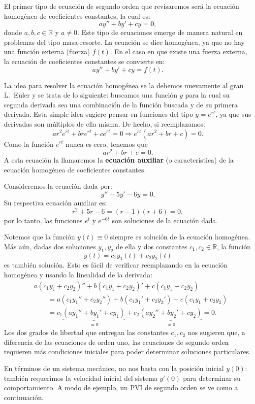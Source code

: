 El primer tipo de ecuaci\'on de segundo orden que revisaremos ser\'a la ecuaci\'on homog\'enea de coeficientes constantes, la cual es:
\[
ay''+by'+cy=0,
\]
donde $a,b,c\in\mathbb{R}$ y $a\neq 0$. Este tipo de ecuaciones emerge de manera natural en problemas del tipo masa-resorte. La ecuaci\'on se dice homog\'enea, ya que no hay una funci\'on externa (fuerza) $f(t)$. En el caso en que existe una fuerza externa, la ecuaci\'on de coeficientes constantes se convierte en:
\[
ay''+by'+cy=f(t).
\]

La idea para resolver la ecuaci\'on homog\'enea se la debemos nuevamente al gran L.~Euler y se trata de lo siguiente: buscamos una funci\'on $y$ para la cual su segunda derivada sea una combinaci\'on de la funci\'on buscada y de su primera derivada. Esta simple idea sugiere pensar en funciones del tipo $y=e^{rt}$, ya que sus derivadas son m\'ultiplos de ella misma. De hecho, si reemplazamos:
\[
ar^2e^{rt}+bre^{rt}+ce^{rt}=0\Longrightarrow e^{rt}(ar^2+br+c)=0.
\]
Como la funci\'on $e^{rt}$ nunca es cero, tenemos que
\[
ar^2+br+c=0.
\]
A esta ecuaci\'on la llamaremos la \textbf{ecuaci\'on auxiliar} (o caracter\'istica) de la ecuaci\'on homog\'enea de coeficientes constantes.

\begin{example}
  Consideremos la ecuaci\'on dada por:
  \[
  y''+5y'-6y=0.
  \]
  Su respectiva ecuaci\'on auxiliar es:
  \[
  r^2+5r-6=(r-1)(r+6)=0,
  \]
  por lo tanto, las funciones $e^{t}$ y $e^{-6t}$ son soluciones de la ecuaci\'on dada.
\end{example}
\newpage
\begin{remark}
    Notemos que la funci\'on $y(t)\equiv 0$ siempre es soluci\'on de la ecuaci\'on homog\'enea. M\'as a\'un, dadas dos soluciones $y_1,y_2$ de ella y dos constantes $c_1,c_2\in \mathbb{R}$, la funci\'on
    \[
    y(t)=c_1y_1(t)+c_2y_2(t)
    \]
    es tambi\'en soluci\'on. Esto es f\'acil de verificar reemplazando en la ecuaci\'on homog\'enea y usando la linealidad de la derivada:
    \begin{align*}
      &a(c_1y_1+c_2y_2)''+b(c_1y_1+c_2y_2)'+c(c_1y_1+c_2y_2)\\
      &\qquad= a(c_1y_1''+c_2y_2'')+b(c_1y_1'+c_2y_2')+c(c_1y_1+c_2y_2)\\
      &\qquad= c_1\underbrace{(ay_1''+by_1'+cy_1)}_{=0}+c_2\underbrace{(ay_2''+by_2'+cy_2)}_{=0}=0.
    \end{align*}
    Los dos grados de libertad que entregan las constantes $c_1,c_2$ nos sugieren que, a diferencia de las ecuaciones de orden uno, las ecuaciones de segundo orden requieren m\'as condiciones iniciales para poder determinar soluciones particulares.

    En t\'erminos de un sistema mec\'anico, no nos basta con la posici\'on inicial $y(0)$: tambi\'en requerimos la velocidad inicial del sistema $y'(0)$ para determinar su comportamiento. A modo de ejemplo, un PVI de segundo orden se ve como a continuaci\'on.
\end{remark}

